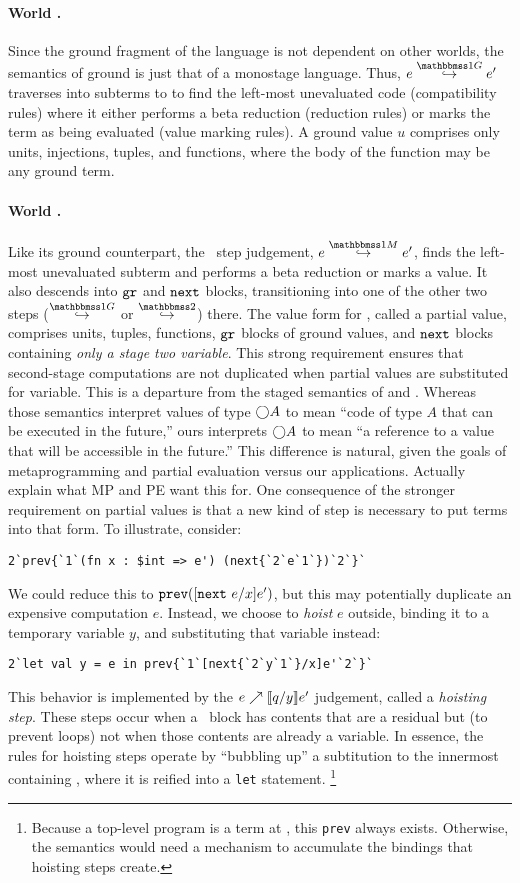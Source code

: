 \paragraph{World \bbonep.} Since the ground fragment of the language is not dependent on other worlds, the semantics of ground is just that of a monostage language.
Thus, $\steppure e {e'}$ traverses into subterms to to find the left-most unevaluated code (compatibility rules) 
where it either performs a beta reduction (reduction rules) or marks the term as being evaluated (value marking rules). 
A ground value $u$ comprises only units, injections, tuples, and functions, where the body of the function may be any ground term.

\paragraph{World \bbonem.}
Like its ground counterpart, the \bbonem\ step judgement, $\stepmix e {e'}$, finds the left-most unevaluated subterm and performs a beta reduction or marks a value.
It also descends into ${\tt gr}$ and ${\tt next}$ blocks, transitioning into one of the other two steps ($\stepsym \bbonep$ or $\stepsym \bbtwo$) there. 
The value form for \bbonem, called a partial value, comprises units, tuples, functions, ${\tt gr}$ blocks of ground values, and ${\tt next}$ blocks containing \emph{only a stage two variable}.
This strong requirement ensures that second-stage computations are not duplicated when partial values are substituted for variable.
This is a departure from the staged semantics of \cite{taha-thesis-99} and \cite{davies96}.
Whereas those semantics interpret values of type $\bigcirc A$ to mean ``code of type $A$ that can be executed in the future,''
ours interprets $\bigcirc A$ to mean ``a reference to a value that will be accessible in the future.''
This difference is natural, given the goals of metaprogramming and partial evaluation versus our applications.
\TODO Actually explain what MP and PE want this for.
One consequence of the stronger requirement on partial values is that a new kind of step is necessary to put terms into that form.
To illustrate, consider:
\begin{lstlisting}
2`prev{`1`(fn x : $int => e') (next{`2`e`1`})`2`}`
\end{lstlisting}
We could reduce this to ${\tt prev}([{\tt next}~e/x]e')$, but this may potentially duplicate an
expensive computation $e$. Instead, we choose to \emph{hoist} $e$ outside, binding it
to a temporary variable $y$, and substituting that variable instead:
\begin{lstlisting} 
2`let val y = e in prev{`1`[next{`2`y`1`}/x]e'`2`}`
\end{lstlisting}
This behavior is implemented by the ${e}\nearrow \llbracket q/y \rrbracket{e'}$ judgement, called a \emph{hoisting step}.
These steps occur when a \next\ block has contents that are a residual but (to prevent loops) not when those contents are already a variable.
In essence, the rules for hoisting steps operate by ``bubbling up'' a subtitution to the innermost containing \prev,
where it is reified into a {\tt let} statement.
\footnote{Because a top-level program is a term at \bbtwo, this {\tt prev} always exists.
Otherwise, the semantics would need a mechanism to accumulate the bindings that hoisting steps create.}

